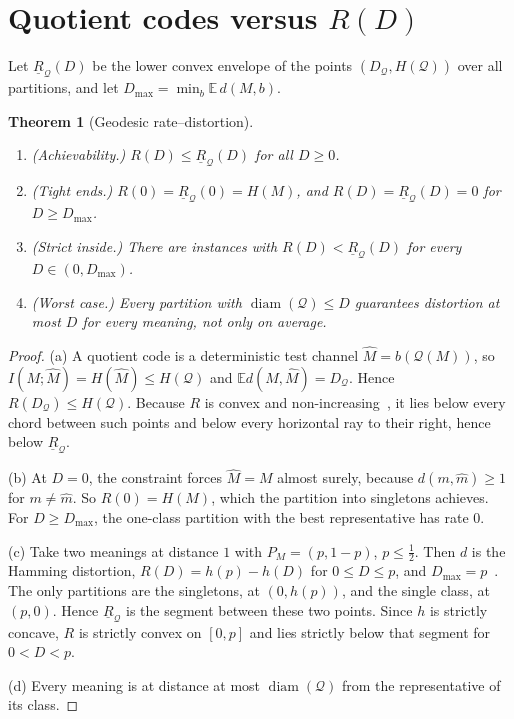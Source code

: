 \documentclass[11pt]{article}
\newtheorem{theorem}{Theorem}
\theoremstyle{definition}
\theoremstyle{remark}
\newcommand{\Q}{\mathcal{Q}}
\newcommand{\E}{\mathbb{E}}
\DeclareMathOperator{\diam}{diam}
\begin{document}
\section{Quotient codes versus $R(D)$}

Let $\underline{R}_\Q(D)$ be the lower convex envelope of the points $(D_\Q,H(\Q))$ over all partitions, and let $D_{\max}=\min_{b}\E\,d(M,b)$.

\begin{theorem}[Geodesic rate--distortion]\label{thm:rd}
\begin{enumerate}
\item[(a)] \emph{(Achievability.)} $R(D)\le\underline{R}_\Q(D)$ for all $D\ge0$.
\item[(b)] \emph{(Tight ends.)} $R(0)=\underline{R}_\Q(0)=H(M)$, and $R(D)=\underline{R}_\Q(D)=0$ for $D\ge D_{\max}$.
\item[(c)] \emph{(Strict inside.)} There are instances with $R(D)<\underline{R}_\Q(D)$ for every $D\in(0,D_{\max})$.
\item[(d)] \emph{(Worst case.)} Every partition with $\diam(\Q)\le D$ guarantees distortion at most $D$ for every meaning, not only on average.
\end{enumerate}
\end{theorem}

\begin{proof}
(a) A quotient code is a deterministic test channel $\hat M=b(\Q(M))$, so $I(M;\hat M)=H(\hat M)\le H(\Q)$ and $\E d(M,\hat M)=D_\Q$. Hence $R(D_\Q)\le H(\Q)$. Because $R$ is convex and non-increasing~\cite{cover2006}, it lies below every chord between such points and below every horizontal ray to their right, hence below $\underline{R}_\Q$.

(b) At $D=0$, the constraint forces $\hat M=M$ almost surely, because $d(m,\hat m)\ge1$ for $m\ne\hat m$. So $R(0)=H(M)$, which the partition into singletons achieves. For $D\ge D_{\max}$, the one-class partition with the best representative has rate $0$.

(c) Take two meanings at distance $1$ with $P_M=(p,1-p)$, $p\le\tfrac12$. Then $d$ is the Hamming distortion, $R(D)=h(p)-h(D)$ for $0\le D\le p$, and $D_{\max}=p$~\cite{cover2006}. The only partitions are the singletons, at $(0,h(p))$, and the single class, at $(p,0)$. Hence $\underline{R}_\Q$ is the segment between these two points. Since $h$ is strictly concave, $R$ is strictly convex on $[0,p]$ and lies strictly below that segment for $0<D<p$.

(d) Every meaning is at distance at most $\diam(\Q)$ from the representative of its class.
\end{proof}
\end{document}
